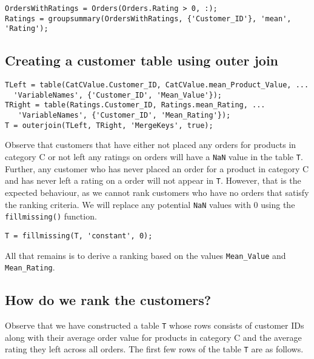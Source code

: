 \begin{lstlisting}
OrdersWithRatings = Orders(Orders.Rating > 0, :);
Ratings = groupsummary(OrdersWithRatings, {'Customer_ID'}, 'mean', 'Rating');
\end{lstlisting}

\newpage
\subsection{Creating a customer table using outer join}


\begin{lstlisting}
TLeft = table(CatCValue.Customer_ID, CatCValue.mean_Product_Value, ...
  'VariableNames', {'Customer_ID', 'Mean_Value'});
TRight = table(Ratings.Customer_ID, Ratings.mean_Rating, ...
   'VariableNames', {'Customer_ID', 'Mean_Rating'});
T = outerjoin(TLeft, TRight, 'MergeKeys', true);
\end{lstlisting}

\noindent
Observe that customers that have either not placed any orders for products in category C or not left any ratings on orders will have a \lstinline|NaN| value in the table \lstinline|T|. Further, any customer who has never placed an order for a product in category C and has never left a rating on a order will not appear in \lstinline|T|. However, that is the expected behaviour, as we cannot rank customers who have no orders that satisfy the ranking criteria. We will replace any potential \lstinline|NaN| values with 0 using the \lstinline|fillmissing()| function.

\begin{lstlisting}
T = fillmissing(T, 'constant', 0);
\end{lstlisting}

\noindent
All that remains is to derive a ranking based on the values \lstinline|Mean_Value| and \lstinline|Mean_Rating|. \\

\subsection{How do we rank the customers?}
Observe that we have constructed a table \lstinline|T| whose rows consists of customer IDs along with their average order value for products in category C and the average rating they left across all orders. The first few rows of the table \lstinline|T| are as follows.


